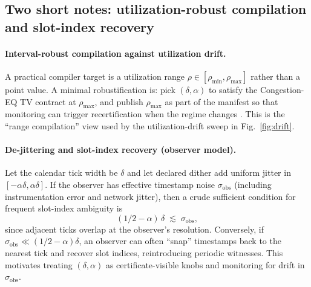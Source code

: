 \documentclass[11pt]{article}
\theoremstyle{definition}
\theoremstyle{remark}
\begin{document}
\subsection{Two short notes: utilization-robust compilation and slot-index recovery}
\paragraph{Interval-robust compilation against utilization drift.}
A practical compiler target is a utilization range $\rho\in[\rho_{\min},\rho_{\max}]$ rather than a point value.
A minimal robustification is: pick $(\delta,\alpha)$ to satisfy the Congestion-EQ TV contract at $\rho_{\max}$,
and publish $\rho_{\max}$ as part of the manifest so that monitoring can trigger recertification when the regime changes \cite{series:recert}.
This is the ``range compilation'' view used by the utilization-drift sweep in Fig.~\ref{fig:drift}.

\paragraph{De-jittering and slot-index recovery (observer model).}
Let the calendar tick width be $\delta$ and let declared dither add uniform jitter in $[-\alpha\delta,\alpha\delta]$.
If the observer has effective timestamp noise $\sigma_{\mathrm{obs}}$ (including instrumentation error and network jitter),
then a crude sufficient condition for frequent slot-index ambiguity is
\[
(1/2-\alpha)\,\delta \;\lesssim\; \sigma_{\mathrm{obs}},
\]
since adjacent ticks overlap at the observer's resolution.
Conversely, if $\sigma_{\mathrm{obs}}\ll (1/2-\alpha)\delta$, an observer can often ``snap'' timestamps back to the nearest tick
and recover slot indices, reintroducing periodic witnesses. This motivates treating $(\delta,\alpha)$ as certificate-visible knobs
and monitoring for drift in $\sigma_{\mathrm{obs}}$.
\end{document}
